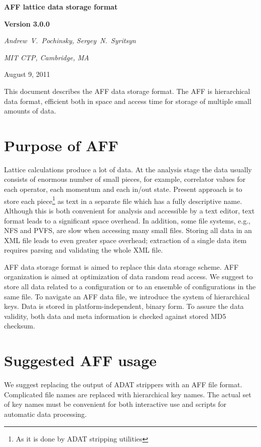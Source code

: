 \documentclass[10pt,letterpaper]{article}
\begin{document}
\centerline{\huge\bf AFF lattice data storage format}
\vspace{15pt}
\centerline{\huge\bf Version 3.0.0}
\vspace{15pt}
\centerline{\it Andrew~V.~Pochinsky, Sergey~N.~Syritsyn}
\centerline{\it MIT CTP, Cambridge, MA}
\vspace{10pt}
\centerline{August 9, 2011}
\vspace{20pt}

\noindent This document describes the AFF data storage format. 
The AFF is hierarchical data format, efficient both in space and access time 
for storage of multiple small amounts of data.

\tableofcontents

\section{Purpose of AFF}
Lattice calculations produce a lot of data. 
At the analysis stage the data usually consists of enormous number of small
pieces, for example, correlator values for
each operator, each momentum and each in/out state.
Present approach is to store each
piece\footnote{As it is done by ADAT stripping utilities}
as text in a separate file which has a fully descriptive name. 
Although this is both convenient for analysis and accessible by a text editor,
text format leads to a significant space overhead. 
In addition, some file systems, e.g., NFS and PVFS, are slow when accessing
many small files. 
Storing all data in an XML file leads to even greater space overhead;
extraction of a single data item requires parsing and validating the
whole XML file.

AFF data storage format is aimed to replace this data storage scheme. 
AFF organization is aimed at optimization of data random read access.
We suggest to store all data related to a configuration or to an ensemble of configurations in
the same file.
To navigate an AFF data file, we introduce the system of hierarchical keys.
Data is stored in platform-independent, binary form.
To assure the data validity, both data and meta information is checked against stored
MD5 checksum.


\section{Suggested AFF usage}

We suggest replacing the output of ADAT strippers with an AFF file format. 
Complicated file names are replaced with hierarchical key names. 
The actual set of key names must be convenient for both interactive use and 
scripts for automatic data processing.
\end{document}
